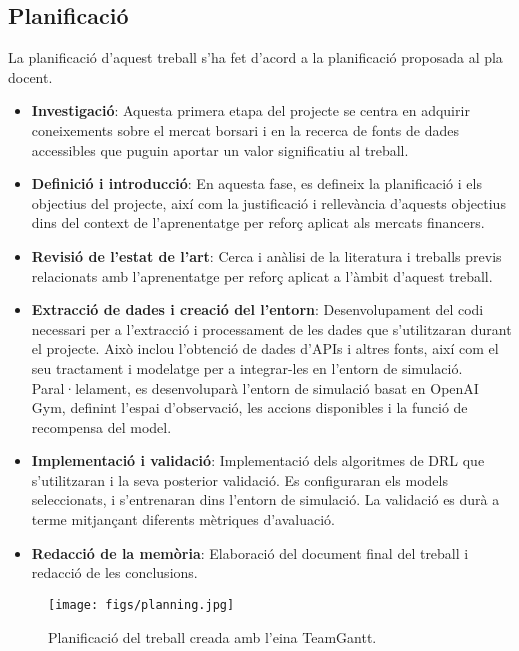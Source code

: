 \documentclass[12pt,a4paper,twoside]{book}
\begin{document}
\subsection{Planificació}
La planificació d'aquest treball s'ha fet d'acord a la planificació proposada al pla docent.
\begin{itemize}

    \item  \textbf{Investigació}: Aquesta primera etapa del projecte se centra en adquirir coneixements sobre el mercat borsari i en la recerca de fonts de dades accessibles que puguin aportar un valor significatiu al treball.

    \item \textbf{Definició i introducció}: En aquesta fase, es defineix la planificació i els objectius del projecte, així com la justificació i rellevància d'aquests objectius dins del context de l'aprenentatge per reforç aplicat als mercats financers.

    \item \textbf{Revisió de l'estat de l'art}: Cerca i anàlisi de la literatura i treballs previs relacionats amb l'aprenentatge per reforç aplicat a l'àmbit d'aquest treball.
    \item \textbf{Extracció de dades i creació del l'entorn}: Desenvolupament del codi necessari per a l'extracció i processament de les dades que s'utilitzaran durant el projecte. Això inclou l'obtenció de dades d'APIs i altres fonts, així com el seu tractament i modelatge per a integrar-les en l'entorn de simulació. Paral·lelament, es desenvoluparà l'entorn de simulació basat en OpenAI Gym, definint l'espai d'observació, les accions disponibles i la funció de recompensa del model.

    \item \textbf{Implementació i validació}: Implementació dels algoritmes de DRL que s'utilitzaran i la seva posterior validació. Es configuraran els models seleccionats, i s'entrenaran dins l'entorn de simulació. La validació es durà a terme mitjançant diferents mètriques d'avaluació.

    \item \textbf{Redacció de la memòria}: Elaboració del document final del treball i redacció de les conclusions.

\end{itemize}

\begin{figure}[H]
	\centering
	\texttt{[image: figs/planning.jpg]}
	\caption{Planificació del treball creada amb l'eina TeamGantt\cite{TeamGantt}.}
	\label{fig:context-anoni1}
\end{figure}
\end{document}
